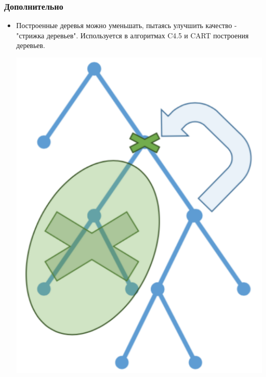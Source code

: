 \documentclass[14pt]{beamer}
\begin{document}
\begin{frame}
\frametitle{Дополнительно}
	  \begin {itemize}
		\item Построенные деревья можно уменьшать, пытаясь улучшить качество - "стрижка деревьев". Используется в алгоритмах C4.5 и CART построения деревьев.
		\begin{center}
		    \includegraphics[height=0.5\textheight]{tree_pruning.png}
		\end{center}
	  \end {itemize}
\end{frame}
\end{document}
